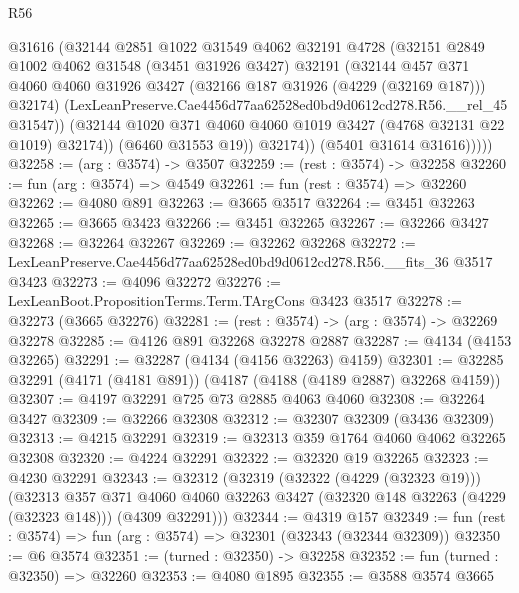\begin{lexlean}{R56}
\begin{coremodule}
                  @31616
                  (@32144
                    @2851
                    @1022
                    @31549
                    @4062
                    @32191
                    @4728
                    (@32151
                      @2849
                      @1002
                      @4062
                      @31548
                      (@3451 @31926 @3427)
                      @32191
                      (@32144
                        @457
                        @371
                        @4060
                        @4060
                        @31926
                        @3427
                        (@32166 @187 @31926 (@4229 (@32169 @187)))
                        @32174)
                      (LexLeanPreserve.Cae4456d77aa62528ed0bd9d0612cd278.R56.__rel_45 @31547))
                    (@32144 @1020 @371 @4060 @4060 @1019 @3427 (@4768 @32131 @22 @1019) @32174))
                  (@6460 @31553 @19))
                @32174))
            (@5401 @31614 @31616)))))
@32258 := (arg : @3574) -> @3507
@32259 := (rest : @3574) -> @32258
@32260 := fun (arg : @3574) => @4549
@32261 := fun (rest : @3574) => @32260
@32262 := @4080 @891
@32263 := @3665 @3517
@32264 := @3451 @32263
@32265 := @3665 @3423
@32266 := @3451 @32265
@32267 := @32266 @3427
@32268 := @32264 @32267
@32269 := @32262 @32268
@32272 := LexLeanPreserve.Cae4456d77aa62528ed0bd9d0612cd278.R56.__fits_36 @3517 @3423
@32273 := @4096 @32272
@32276 := LexLeanBoot.PropositionTerms.Term.TArgCons @3423 @3517
@32278 := @32273 (@3665 @32276)
@32281 := (rest : @3574) -> (arg : @3574) -> @32269 @32278
@32285 := @4126 @891 @32268 @32278 @2887
@32287 := @4134 (@4153 @32265)
@32291 := @32287 (@4134 (@4156 @32263) @4159)
@32301 := @32285 @32291 (@4171 (@4181 @891)) (@4187 (@4188 (@4189 @2887) @32268 @4159))
@32307 := @4197 @32291 @725 @73 @2885 @4063 @4060
@32308 := @32264 @3427
@32309 := @32266 @32308
@32312 := @32307 @32309 (@3436 @32309)
@32313 := @4215 @32291
@32319 := @32313 @359 @1764 @4060 @4062 @32265 @32308
@32320 := @4224 @32291
@32322 := @32320 @19 @32265
@32323 := @4230 @32291
@32343 := @32312
    (@32319
      (@32322 (@4229 (@32323 @19)))
      (@32313
        @357
        @371
        @4060
        @4060
        @32263
        @3427
        (@32320 @148 @32263 (@4229 (@32323 @148)))
        (@4309 @32291)))
@32344 := @4319 @157
@32349 := fun (rest : @3574) => fun (arg : @3574) => @32301 (@32343 (@32344 @32309))
@32350 := @6 @3574
@32351 := (turned : @32350) -> @32258
@32352 := fun (turned : @32350) => @32260
@32353 := @4080 @1895
@32355 := @3588 @3574 @3665

\end{coremodule}
\end{lexlean}
